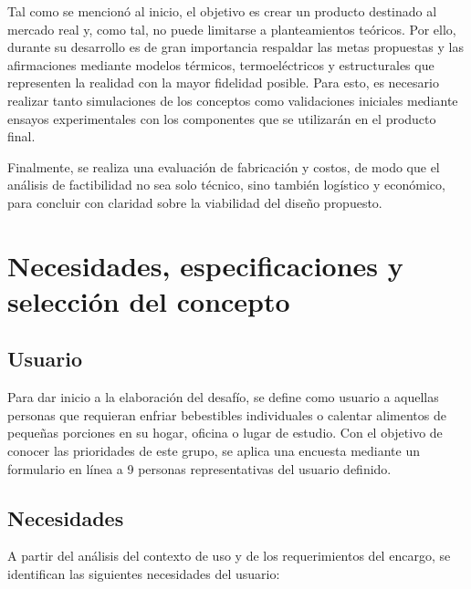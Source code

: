 \documentclass[12pt, a4paper]{article}
\begin{document}
Tal como se mencionó al inicio, el objetivo es crear un producto destinado al mercado real y, como tal, no puede limitarse a planteamientos teóricos. Por ello, durante su desarrollo es de gran importancia respaldar las metas propuestas y las afirmaciones mediante modelos térmicos, termoeléctricos y estructurales que representen la realidad con la mayor fidelidad posible. Para esto, es necesario realizar tanto simulaciones de los conceptos como validaciones iniciales mediante ensayos experimentales con los componentes que se utilizarán en el producto final.

Finalmente, se realiza una evaluación de fabricación y costos, de modo que el análisis de factibilidad no sea solo técnico, sino también logístico y económico, para concluir con claridad sobre la viabilidad del diseño propuesto.

\section{Necesidades, especificaciones y selección del concepto}
\subsection{Usuario}
Para dar inicio a la elaboración del desafío, se define como usuario a aquellas personas que requieran enfriar bebestibles individuales o calentar alimentos de pequeñas porciones en su hogar, oficina o lugar de estudio. Con el objetivo de conocer las prioridades de este grupo, se aplica una encuesta mediante un formulario en línea a 9 personas representativas del usuario definido.

\subsection{Necesidades}
A partir del análisis del contexto de uso y de los requerimientos del encargo, se identifican las siguientes necesidades del usuario:
\end{document}
